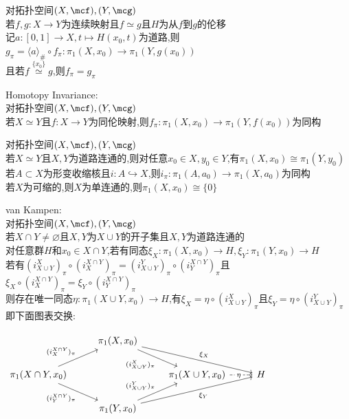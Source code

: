 \begin{dingli}
对拓扑空间$(X,\mcf),(Y,\mcg)$\\
若$f,g:X\to Y$为连续映射且$f\simeq g$且$H$为从$f$到$g$的伦移\\
记$a:[0,1]\to X,t\mapsto H(x_0,t)$为道路,则$g_{\pi}=\langle a\rangle_{\#}\circ f_{\pi}:\pi_1(X,x_0)\to \pi_1(Y,g(x_0))$\\
且若$f\mathop{\simeq}\limits^{\{x_0\}}g$,则$f_{\pi}=g_{\pi}$
\end{dingli}

\begin{dingli}
Homotopy Invariance:\\
对拓扑空间$(X,\mcf),(Y,\mcg)$\\
若$X\simeq Y$且$f:X\to Y$为同伦映射,则$f_{\pi}:\pi_{1}(X,x_0)\to\pi_1(Y,f(x_0))$为同构
\end{dingli}

\begin{dingli}
对拓扑空间$(X,\mcf),(Y,\mcg)$\\
若$X\simeq Y$且$X,Y$为道路连通的,则对任意$x_0\in X,y_0\in Y$,有$\pi_1(X,x_0)\cong \pi_1(Y,y_0)$\\
若$A\subset X$为形变收缩核且$i:A\hookrightarrow X$,则$i_{\pi}:\pi_{1}(A,a_0)\to\pi_1(X,a_0)$为同构\\
若$X$为可缩的,则$X$为单连通的,则$\pi_1(X,x_0)\cong\{0\}$
\end{dingli}

\begin{dingli}
van Kampen:\\
对拓扑空间$(X,\mcf),(Y,\mcg)$\\
若$X\cap Y\neq\varnothing$且$X,Y$为$X\cup Y$的开子集且$X,Y$为道路连通的\\
对任意群$H$和$x_0\in X\cap Y$,若有同态$\xi_{X}:\pi_1(X,x_0)\to H,\xi_{Y}:\pi_1(Y,x_0)\to H$\\
若有$(i_{X\cup Y}^{X})_{\pi}\circ(i_{X}^{X\cap Y})_{\pi}=(i_{X\cup Y}^{Y})_{\pi}\circ(i_{Y}^{X\cap Y})_{\pi}$且$\xi_{X}\circ(i_{X}^{X\cap Y})_{\pi}=\xi_{Y}\circ(i_{Y}^{X\cap Y})_{\pi}$\\
则存在唯一同态$\eta:\pi_1(X\cup Y,x_0)\to H$,有$\xi_{X}=\eta\circ(i_{X\cup Y}^{X})_{\pi}$且$\xi_{Y}=\eta\circ(i_{X\cup Y}^{Y})_{\pi}$\\
即下面图表交换:
\begin{center}
    $\begin{tikzcd}
     & \pi_1(X,x_0) \ar[dr,"(i_{X\cup Y}^{X})_{\pi}"'] \ar[drr,"\xi_{X}"] & & \\
    \pi_1(X\cap Y,x_0) \ar[ur,"(i_{X}^{X\cap Y})_{\pi}"] \ar[dr,"(i_{Y}^{X\cap Y})_{\pi}"'] & & \pi_1(X\cup Y,x_0) \ar[r,dashed,"\eta"{overlay,fill=white,yshift=-5.5pt,pos=0.4}] & H \\
     & \pi_1(Y,x_0) \ar[ur,"(i_{X\cup Y}^{Y})_{\pi}"] \ar[urr,"\xi_{Y}"'] & & 
    \end{tikzcd}$
\end{center}
\end{dingli}

